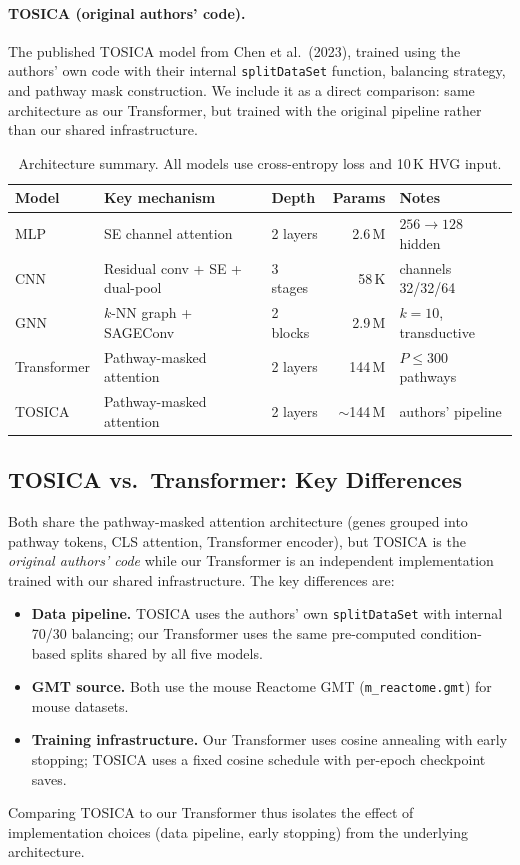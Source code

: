 \documentclass[11pt,letterpaper]{article}
\begin{document}
\paragraph{TOSICA (original authors' code).}
The published TOSICA model from Chen et al.\ (2023), trained using the authors'
own code with their internal \texttt{splitDataSet} function, balancing strategy,
and pathway mask construction. We include it as a direct comparison: same
architecture as our Transformer, but trained with the original pipeline rather
than our shared infrastructure.

\begin{table}[H]
\centering
\caption{Architecture summary. All models use cross-entropy loss and 10\,K HVG
input.}
\label{tab:arch}
\footnotesize
\begin{tabular}{@{}lllrl@{}}
\toprule
Model & Key mechanism & Depth & Params & Notes \\
\midrule
MLP         & SE channel attention        & 2 layers   & 2.6\,M  & $256{\to}128$ hidden \\
CNN         & Residual conv + SE + dual-pool & 3 stages & 58\,K   & channels 32/32/64 \\
GNN         & $k$-NN graph + SAGEConv     & 2 blocks   & 2.9\,M  & $k{=}10$, transductive \\
Transformer & Pathway-masked attention    & 2 layers   & 144\,M  & $P{\leq}300$ pathways \\
TOSICA      & Pathway-masked attention    & 2 layers   & ${\sim}$144\,M & authors' pipeline \\
\bottomrule
\end{tabular}
\end{table}

\subsection{TOSICA vs.\ Transformer: Key Differences}
Both share the pathway-masked attention architecture (genes grouped into pathway
tokens, CLS attention, Transformer encoder), but TOSICA is the \emph{original
authors' code} while our Transformer is an independent implementation trained
with our shared infrastructure. The key differences are:
\begin{itemize}
    \item \textbf{Data pipeline.} TOSICA uses the authors' own
    \texttt{splitDataSet} with internal 70/30 balancing; our Transformer uses
    the same pre-computed condition-based splits shared by all five models.
    \item \textbf{GMT source.} Both use the mouse Reactome GMT
    (\texttt{m\_reactome.gmt}) for mouse datasets.
    \item \textbf{Training infrastructure.} Our Transformer uses cosine
    annealing with early stopping; TOSICA uses a fixed cosine schedule with
    per-epoch checkpoint saves.
\end{itemize}
\noindent Comparing TOSICA to our Transformer thus isolates the effect of
implementation choices (data pipeline, early stopping) from the underlying
architecture.
\end{document}
